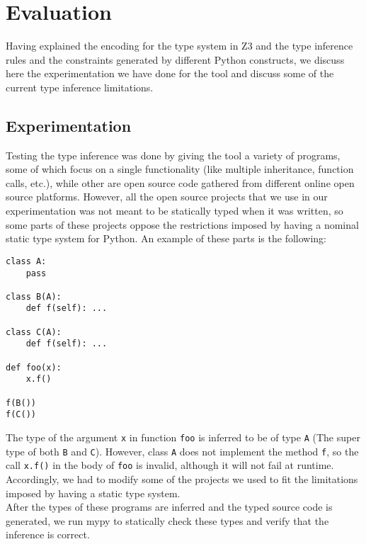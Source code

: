 
\chapter{Evaluation}\label{chapter:eval}
Having explained the encoding for the type system in Z3 and the type inference rules and the constraints generated by different Python constructs, we discuss here the experimentation we have done for the tool and discuss some of the current type inference limitations.

\section{Experimentation}
Testing the type inference was done by giving the tool a variety of programs, some of which focus on a single functionality (like multiple inheritance, function calls, etc.), while other are open source code gathered from different online open source platforms. However, all the open source projects that we use in our experimentation was not meant to be statically typed when it was written, so some parts of these projects oppose the restrictions imposed by having a nominal static type system for Python. An example of these parts is the following:

\begin{lstlisting}
class A:
	pass
	
class B(A):
	def f(self): ...

class C(A):
	def f(self): ...

def foo(x):
	x.f()
	
f(B())
f(C())
\end{lstlisting}

The type of the argument \lstinline|x| in function \lstinline|foo| is inferred to be of type \lstinline|A| (The super type of both \lstinline|B| and \lstinline|C|). However, class \lstinline|A| does not implement the method \lstinline|f|, so the call \lstinline|x.f()| in the body of \lstinline|foo| is invalid, although it will not fail at runtime.\\

Accordingly, we had to modify some of the projects we used to fit the limitations imposed by having a static type system. \\

After the types of these programs are inferred and the typed source code is generated, we run mypy \cite{mypy} to statically check these types and verify that the inference is correct.
